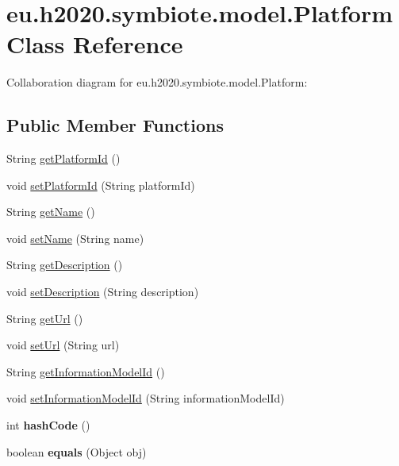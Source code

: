 \hypertarget{classeu_1_1h2020_1_1symbiote_1_1model_1_1Platform}{}\section{eu.\+h2020.\+symbiote.\+model.\+Platform Class Reference}
\label{classeu_1_1h2020_1_1symbiote_1_1model_1_1Platform}


Collaboration diagram for eu.\+h2020.\+symbiote.\+model.\+Platform\+:
\subsection*{Public Member Functions}
\begin{DoxyCompactItemize}
\item 
String \hyperlink{classeu_1_1h2020_1_1symbiote_1_1model_1_1Platform_a2a09b94af05846adcf58f6405f0b1fdc}{get\+Platform\+Id} ()
\item 
void \hyperlink{classeu_1_1h2020_1_1symbiote_1_1model_1_1Platform_a3d9e886790d506f713e997f3c587e8ac}{set\+Platform\+Id} (String platform\+Id)
\item 
String \hyperlink{classeu_1_1h2020_1_1symbiote_1_1model_1_1Platform_a9d39e85c470888c7043448f2eb059325}{get\+Name} ()
\item 
void \hyperlink{classeu_1_1h2020_1_1symbiote_1_1model_1_1Platform_af4d5506c08659b3d71dcc8bf69c743ce}{set\+Name} (String name)
\item 
String \hyperlink{classeu_1_1h2020_1_1symbiote_1_1model_1_1Platform_ad4a8d6cbb5ed57e241f783c512f052d9}{get\+Description} ()
\item 
void \hyperlink{classeu_1_1h2020_1_1symbiote_1_1model_1_1Platform_a9ec81f09b9fcd25ae264618591992cb2}{set\+Description} (String description)
\item 
String \hyperlink{classeu_1_1h2020_1_1symbiote_1_1model_1_1Platform_a4ca440b89e37c323dcb812ef07cfb66a}{get\+Url} ()
\item 
void \hyperlink{classeu_1_1h2020_1_1symbiote_1_1model_1_1Platform_ac4d39a74475da2c2318cfd5e3667a5a1}{set\+Url} (String url)
\item 
String \hyperlink{classeu_1_1h2020_1_1symbiote_1_1model_1_1Platform_a799a5bb8e0665457c4b8bfd2b34c9b3c}{get\+Information\+Model\+Id} ()
\item 
void \hyperlink{classeu_1_1h2020_1_1symbiote_1_1model_1_1Platform_ae3e1cb93bcb289d575f215990d7e9499}{set\+Information\+Model\+Id} (String information\+Model\+Id)
\item 
int {\bfseries hash\+Code} ()\hypertarget{classeu_1_1h2020_1_1symbiote_1_1model_1_1Platform_a3b85d6919db55e5a8584a909a4599953}{}\label{classeu_1_1h2020_1_1symbiote_1_1model_1_1Platform_a3b85d6919db55e5a8584a909a4599953}

\item 
boolean {\bfseries equals} (Object obj)\hypertarget{classeu_1_1h2020_1_1symbiote_1_1model_1_1Platform_ab00da56375115817b0594f8865667d30}{}\label{classeu_1_1h2020_1_1symbiote_1_1model_1_1Platform_ab00da56375115817b0594f8865667d30}

\end{DoxyCompactItemize}


